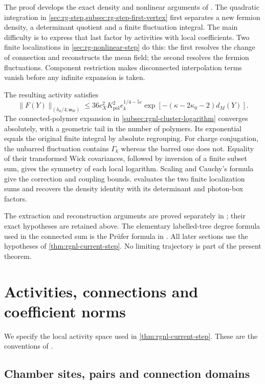 The proof develops the exact density and nonlinear arguments of
\cite[\S\S13--14]{QED3Master}. The quadratic integration in \cref{sec:rg-step,subsec:rg-step-first-vertex} first
separates a new fermion density, a determinant quotient and a finite
fluctuation integral. The main difficulty is to express that last
factor by activities with local coefficients. Two finite
localizations in \cref{sec:rg-nonlinear-step} do this: the first resolves the change of connection
and reconstructs the mean field; the second resolves the fermion
fluctuations. Component restriction makes disconnected interpolation
terms vanish before any infinite expansion is taken.

The resulting activity satisfies
\[
 \|F(Y)\|_{(h_k/4;\mathsf w_W)}
 \le36c_X^2K_{\mathrm{pol}}^2e_k^{1/4-5\varepsilon}
                 \exp[-(\kappa-2\kappa_0-2)d_M(Y)].
\]
The connected-polymer expansion in \cref{subsec:rgnl-cluster-logarithm}
converges absolutely, with a
geometric tail in the number of polymers. Its exponential equals
the original finite integral by absolute regrouping. For charge
conjugation, the unbarred fluctuation contains $\Gamma_k$ whereas
the barred one does not. Equality of their transformed Wick
covariances, followed by inversion of a finite subset sum, gives
the symmetry of each local logarithm. Scaling and Cauchy's formula
give the correction and coupling bounds. 
evaluates the two finite localization sums and recovers the density
identity with its determinant and photon-box factors.

The extraction and reconstruction arguments are proved separately in
\cite{NormalizedContraction}; their exact hypotheses are retained
above. The elementary labelled-tree degree formula used in the
connected sum is the Pr\"ufer formula in
\cite[Proposition~4]{PostnikovLin2019}. All later sections use the
hypotheses of \cref{thm:rgnl-current-step}. No limiting trajectory is
part of the present theorem.
\section{Activities, connections and coefficient norms}
\label{sec:activities}

We specify the local activity space used in \cref{thm:rgnl-current-step}.
These are the conventions of \cite[\S2]{NormalizedContraction}.

\subsection{Chamber sites, pairs and connection domains}

